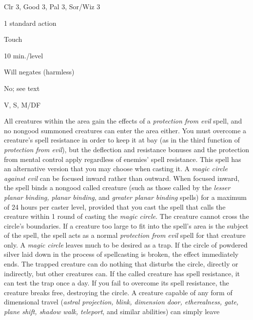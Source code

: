 
\begin{description*}
\item[Level:] Clr 3, Good 3, Pal 3, Sor/Wiz 3
\item[Casting Time:] 1 standard action
\item[Range:] Touch
\item[Duration:] 10 min./level
\item[Saving Throw:] Will negates (harmless)
\item[Spell Resistance:] No; see text
\item[Components:] V, S, M/DF
\end{description*}

All creatures within the area gain the effects of a \textit{protection from evil
}spell, and no nongood summoned creatures can enter the area either. You must overcome
a creature's spell resistance in order to keep it at bay (as in the third function
of \textit{protection from evil}), but the deflection and resistance bonuses and
the protection from mental control apply regardless of enemies' spell resistance.
This spell has an alternative version that you may choose when casting it. A \textit{magic
circle against evil} can be focused inward rather than outward. When focused inward,
the spell binds a nongood called creature (such as those called by the \textit{lesser
planar binding, planar binding}, and \textit{greater planar binding} spells) for
a maximum of 24 hours per caster level, provided that you cast the spell that calls
the creature within 1 round of casting the \textit{magic circle}. The creature
cannot cross the circle's boundaries. If a creature too large to fit into the spell's
area is the subject of the spell, the spell acts as a normal \textit{protection
from evil} spell for that creature only.
A \textit{magic circle} leaves much to be desired as a trap. If the circle of powdered
silver laid down in the process of spellcasting is broken, the effect immediately
ends. The trapped creature can do nothing that disturbs the circle, directly or
indirectly, but other creatures can. If the called creature has spell resistance,
it can test the trap once a day. If you fail to overcome its spell resistance,
the creature breaks free, destroying the circle. A creature capable of any form
of dimensional travel (\textit{astral projection, blink, dimension door, etherealness,
gate, plane shift, shadow walk, teleport}, and similar abilities) can simply leave
